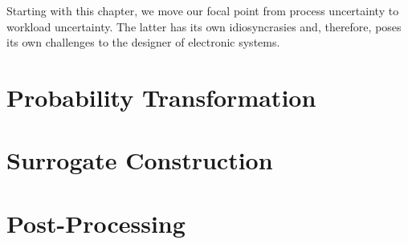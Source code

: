 Starting with this chapter, we move our focal point from process uncertainty to
workload uncertainty. The latter has its own idiosyncrasies and, therefore,
poses its own challenges to the designer of electronic systems.

\section{\introductiontitle}

\section{\motivationtitle}

\section{\problemtitle}

\section{\pasttitle}

\section{\solutiontitle}

\section{Probability Transformation}

\section{Surrogate Construction}

\section{Post-Processing}

\section{\applicationtitle}

\section{\resultstitle}

\section{\conclusiontitle}
